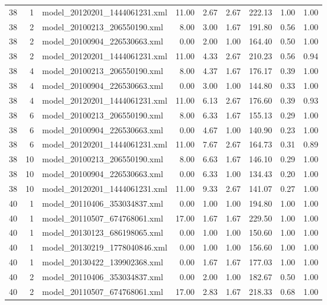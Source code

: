 \begin{table}[ht]
\begin{tabular}{rrlrrrrrr}
   38 &   1 & model\_20120201\_1444061231.xml & 11.00 & 2.67 & 2.67 & 222.13 & 1.00 & 1.00 \\ 
   38 &   2 & model\_20100213\_206550190.xml & 8.00 & 3.00 & 1.67 & 191.80 & 0.56 & 1.00 \\ 
   38 &   2 & model\_20100904\_226530663.xml & 0.00 & 2.00 & 1.00 & 164.40 & 0.50 & 1.00 \\ 
   38 &   2 & model\_20120201\_1444061231.xml & 11.00 & 4.33 & 2.67 & 210.23 & 0.56 & 0.94 \\ 
   38 &   4 & model\_20100213\_206550190.xml & 8.00 & 4.37 & 1.67 & 176.17 & 0.39 & 1.00 \\ 
   38 &   4 & model\_20100904\_226530663.xml & 0.00 & 3.00 & 1.00 & 144.80 & 0.33 & 1.00 \\ 
   38 &   4 & model\_20120201\_1444061231.xml & 11.00 & 6.13 & 2.67 & 176.60 & 0.39 & 0.93 \\ 
   38 &   6 & model\_20100213\_206550190.xml & 8.00 & 6.33 & 1.67 & 155.13 & 0.29 & 1.00 \\ 
   38 &   6 & model\_20100904\_226530663.xml & 0.00 & 4.67 & 1.00 & 140.90 & 0.23 & 1.00 \\ 
   38 &   6 & model\_20120201\_1444061231.xml & 11.00 & 7.67 & 2.67 & 164.73 & 0.31 & 0.89 \\ 
   38 &  10 & model\_20100213\_206550190.xml & 8.00 & 6.63 & 1.67 & 146.10 & 0.29 & 1.00 \\ 
   38 &  10 & model\_20100904\_226530663.xml & 0.00 & 6.33 & 1.00 & 134.43 & 0.20 & 1.00 \\ 
   38 &  10 & model\_20120201\_1444061231.xml & 11.00 & 9.33 & 2.67 & 141.07 & 0.27 & 1.00 \\ 
   40 &   1 & model\_20110406\_353034837.xml & 0.00 & 1.00 & 1.00 & 194.80 & 1.00 & 1.00 \\ 
   40 &   1 & model\_20110507\_674768061.xml & 17.00 & 1.67 & 1.67 & 229.50 & 1.00 & 1.00 \\ 
   40 &   1 & model\_20130123\_686198065.xml & 0.00 & 1.00 & 1.00 & 150.60 & 1.00 & 1.00 \\ 
   40 &   1 & model\_20130219\_1778040846.xml & 0.00 & 1.00 & 1.00 & 156.60 & 1.00 & 1.00 \\ 
   40 &   1 & model\_20130422\_139902368.xml & 0.00 & 1.67 & 1.67 & 177.03 & 1.00 & 1.00 \\ 
   40 &   2 & model\_20110406\_353034837.xml & 0.00 & 2.00 & 1.00 & 182.67 & 0.50 & 1.00 \\ 
   40 &   2 & model\_20110507\_674768061.xml & 17.00 & 2.83 & 1.67 & 218.33 & 0.68 & 1.00 \\ 

\end{tabular}
\end{table}
